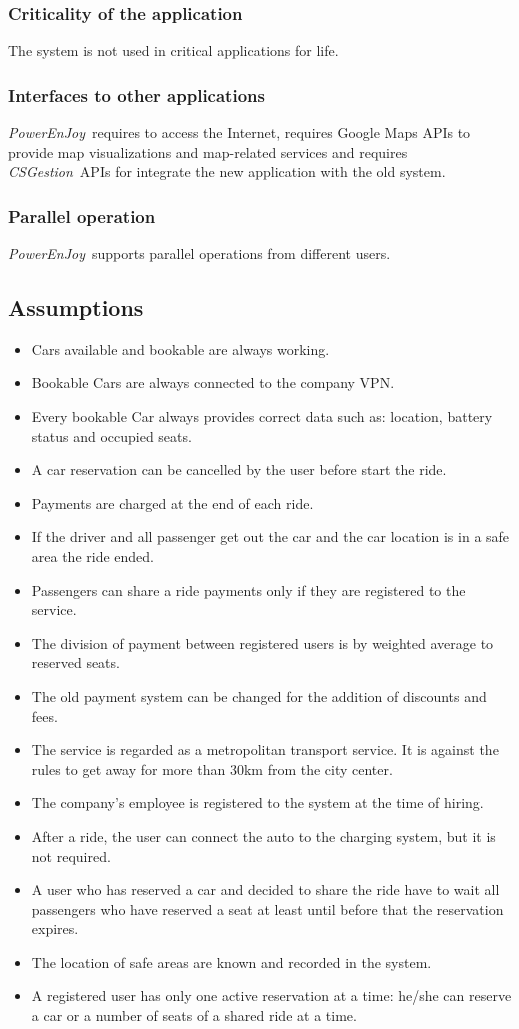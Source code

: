 \documentclass{article}
\newcommand{\pej}{\mbox{\normalfont\itshape PowerEnJoy }}
\newcommand{\csg}{\mbox{\normalfont\itshape CSGestion }}
\begin{document}
		\subsubsection{Criticality of the application} 
		The system is not used in critical applications for life.
		\subsubsection{Interfaces to other applications}
		\pej requires to access the Internet, requires Google Maps APIs to provide map visualizations
		and map-related services and requires \csg APIs for integrate the new application with the old system.
		\subsubsection{Parallel operation}
		\pej supports parallel operations from different users.
		\subsection{Assumptions}
		\begin{itemize}
			\item Cars available and bookable are always working.
			\item Bookable Cars are always connected to the company VPN.
			\item Every bookable Car always provides correct data such as: location, battery status and occupied seats.
			\item A car reservation can be cancelled by the user before start the ride.
			\item Payments are charged at the end of each ride.
			\item If the driver and all passenger get out the car and the car location is in a safe area the ride ended.
			\item Passengers can share a ride payments only if they are registered to the service.
			\item The division of payment between registered users is by weighted average to reserved seats.
			\item The old payment system can be changed for the addition of discounts and fees.
			\item The service is regarded as a metropolitan transport service. It is against the rules to get away for more than 30km from the city center.
			\item The company's employee is registered to the system at the time of hiring.
			\item After a ride, the user can connect the auto to the charging system, but it is not required.
			\item A user who has reserved a car and decided to share the ride have to wait all passengers who have reserved a seat at least until before that the reservation expires.
			\item The location of safe areas are known and recorded in the system.
			\item A registered user has only one active reservation at a time: he/she can reserve a car or a number of seats of a shared ride at a time.
		\end{itemize}
\end{document}
